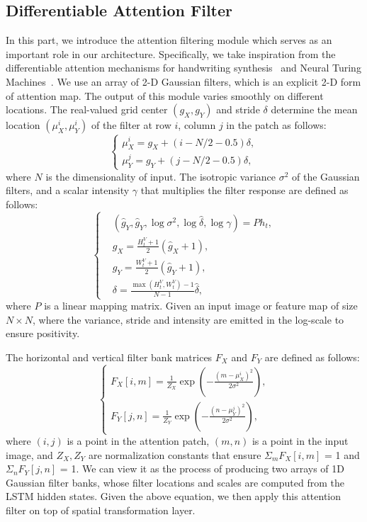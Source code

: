 \documentclass[10pt,twocolumn,letterpaper]{article}
\begin{document}
	\subsection{Differentiable Attention Filter}\label{sec:attention_filter}
	In this part, we introduce the attention filtering module which serves as an important role in our architecture. Specifically, we take inspiration from the differentiable attention mechanisms for handwriting synthesis~\cite{graves2013generating} and Neural Turing Machines~\cite{graves2014neural,gregor2015draw}. We use an array of 2-D Gaussian filters, which is an explicit 2-D form of attention map. The output of this module varies smoothly on different locations.
	The real-valued grid center $(g_X, g_Y)$ and stride $\delta$ determine the mean location $(\mu _X^i, \mu _Y^i)$ of the filter at row $i$, column $j$ in the patch as follows:
	\begin{equation}
	\left\{
	\begin{array}{c}
	\mu _X^i = {g_X} + (i - N/2 - 0.5)\delta,\\
	\mu _Y^j = {g_Y} + (j - N/2 - 0.5)\delta,
	\end{array}
	\right.
	\end{equation}
	where $N$ is the dimensionality of input.
	The isotropic variance $\sigma^2$ of the Gaussian filters, and a scalar intensity $\gamma$ that multiplies the filter response are defined as follows:
	\begin{equation}
	\left\{
	\begin{aligned}
	&(\hat{g}_Y ,\hat{g}_Y,\log {\sigma ^2},\log \hat{\delta},\log \gamma ) = Ph_t,\\
	&{g_X} = \frac{{H_t^V + 1}}{2}(\hat{g}_X  + 1),\\
	&{g_Y} = \frac{{W_t^V + 1}}{2}(\hat{g}_Y  + 1),\\
	&\delta  = \frac{{\max (H_t^V,W_t^V) - 1}}{{N - 1}}\hat{\delta},
	\end{aligned}
	\right.
	\end{equation}
	where $P$ is a linear mapping matrix. Given an input image or feature map of size $N \times N$, where the variance, stride and intensity are emitted in the log-scale to ensure positivity.
	
	The horizontal and vertical filter bank matrices $F_X$ and $F_Y$ are defined as follows:
	\begin{equation}
	\left\{
	\begin{array}{l}
	{F_X}[i,m] = \frac{1}{{{Z_X}}}\exp ( - \frac{{{{(m - \mu _X^i)}^2}}}{{2{\sigma ^2}}}),\\
	{F_Y}[j,n] = \frac{1}{{{Z_Y}}}\exp ( - \frac{{{{(n - \mu _Y^j)}^2}}}{{2{\sigma ^2}}}),
	\end{array}
	\right.
	\end{equation}
	where $(i,j)$ is a point in the attention patch, $(m,n)$ is a point in the input image, and $Z_X, Z_Y$ are normalization constants that ensure $\Sigma _m F_X[i, m]$ = 1 and $\Sigma _n F_Y [j, n]$ = 1. We can view it as the process of producing two arrays of 1D Gaussian filter banks, whose filter locations and scales are computed from the LSTM hidden states. Given the above equation, we then apply this attention filter on top of spatial transformation layer.
	
\end{document}
